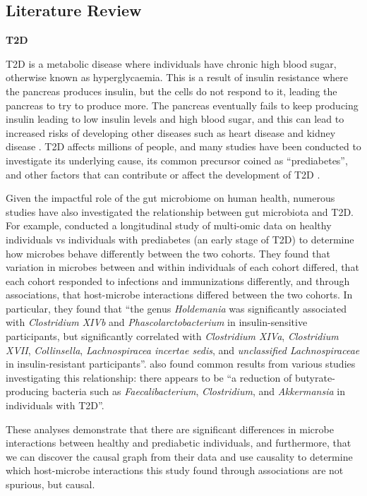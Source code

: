 \documentclass[12pt,letterpaper]{article}
\begin{document}
\subsection{Literature Review}

\textbf{T2D}

T2D is a metabolic disease where individuals have chronic high blood sugar, otherwise known as hyperglycaemia. This is a result of insulin resistance where the pancreas produces insulin, but the cells do not respond to it, leading the pancreas to try to produce more. The pancreas eventually fails to keep producing insulin leading to low insulin levels and high blood sugar, and this can lead to increased risks of developing other diseases such as heart disease and kidney disease \citep{adat2d}. T2D affects millions of people, and many studies have been conducted to investigate its underlying cause, its common precursor coined as “prediabetes”, and other factors that can contribute or affect the development of T2D \citep{tabak2012prediabetes, qin2012mgwast2d, mehta2000hcvt2d}. 

Given the impactful role of the gut microbiome on human health, numerous studies have also investigated the relationship between gut microbiota and T2D. For example, \citep{zhou2019t2d} conducted a longitudinal study of multi-omic data on healthy individuals vs individuals with prediabetes (an early stage of T2D) to determine how microbes behave differently between the two cohorts. They found that variation in microbes between and within individuals of each cohort differed, that each cohort responded to infections and immunizations differently, and through associations, that host-microbe interactions differed between the two cohorts. In particular, they found that “the genus \textit{Holdemania} was significantly associated with \textit{Clostridium XIVb} and \textit{Phascolarctobacterium} in insulin-sensitive participants, but significantly correlated with \textit{Clostridium XIVa}, \textit{Clostridium XVII}, \textit{Collinsella}, \textit{Lachnospiracea incertae sedis}, and \textit{unclassified Lachnospiraceae} in insulin-resistant participants”. \citep{baars2024gutt2d} also found common results from various studies investigating this relationship: there appears to be “a reduction of butyrate-producing bacteria such as \textit{Faecalibacterium}, \textit{Clostridium}, and \textit{Akkermansia} in individuals with T2D”. 

These analyses demonstrate that there are significant differences in microbe interactions between healthy and prediabetic individuals, and furthermore, that we can discover the causal graph from their data and use causality to determine which host-microbe interactions this study found through associations are not spurious, but causal. \newline
\end{document}
